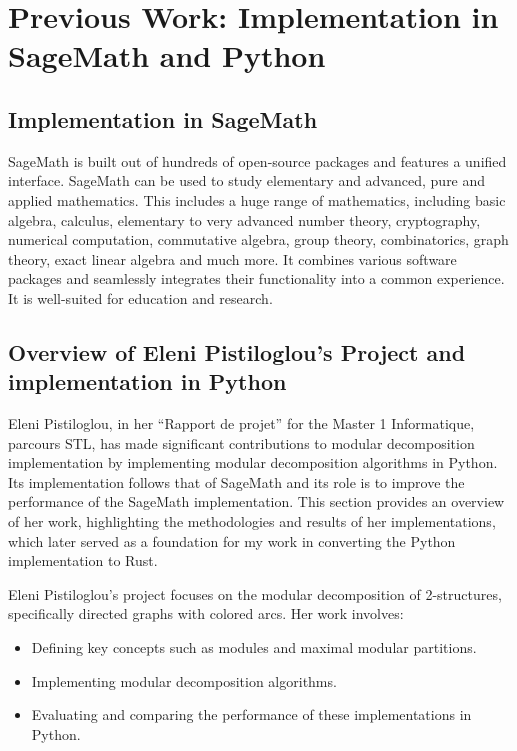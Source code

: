 
\chapter{Previous Work: Implementation in SageMath and Python}\label{ch:previous-work-implementation-in-sagemath-and-python}

\section{Implementation in SageMath}\label{sec:implementation-in-sagemath}

SageMath is built out of hundreds of open-source packages and features a unified interface.
SageMath can be used to study elementary and advanced, pure and applied mathematics.
This includes a huge range of mathematics, including basic algebra, calculus, elementary to very advanced number theory, cryptography, numerical computation, commutative algebra, group theory, combinatorics, graph theory, exact linear algebra and much more.
It combines various software packages and seamlessly integrates their functionality into a common experience.
It is well-suited for education and research.


\section{Overview of Eleni Pistiloglou's Project and implementation in Python}\label{sec:overview-of-eleni-pistiloglou's-project-and-implementation-in-python}

Eleni Pistiloglou, in her ``Rapport de projet''\cite{DM2S} for the Master 1 Informatique, parcours STL, has made significant contributions to modular decomposition implementation by implementing modular decomposition algorithms in Python.
Its implementation follows that of SageMath and its role is to improve the performance of the SageMath implementation.
This section provides an overview of her work, highlighting the methodologies and results of her implementations, which later served as a foundation for my work in converting the Python implementation to Rust.

Eleni Pistiloglou's project focuses on the modular decomposition of 2-structures, specifically directed graphs with colored arcs.
Her work involves:
\begin{itemize}
    \item Defining key concepts such as modules and maximal modular partitions.
    \item Implementing modular decomposition algorithms.
    \item Evaluating and comparing the performance of these implementations in Python.
\end{itemize}

